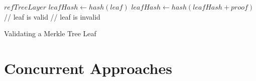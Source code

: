 \begin{algorithm}
    \begin{algorithmic}[1]
        \Require $refTreeLayer$ 
        \State $leafHash \gets hash(leaf)$
            \State $leafHash \gets hash(leafHash + proof)$ 
        \EndFor
            \State // leaf is valid
        \Else
            \State // leaf is invalid
        \EndIf
    \end{algorithmic}
    \caption{Validating a Merkle Tree Leaf}
    \label{alg:validate}
\end{algorithm}

\section{Concurrent Approaches}


